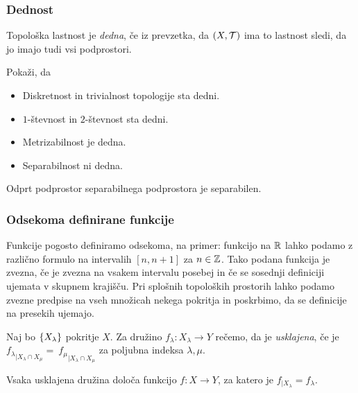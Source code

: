 \subsubsection{Dednost}
\begin{definicija}
    Topološka lastnost je \emph{dedna}, če iz prevzetka, da $(X, \mathcal{T})$ ima to lastnost sledi, da jo imajo tudi vsi podprostori.
\end{definicija}

\begin{primer}
    Pokaži, da
    \begin{itemize}
        \item Diskretnost in trivialnost topologije sta dedni.
        \item $1$-števnost in $2$-števnost sta dedni.
        \item Metrizabilnost je dedna.
        \item Separabilnost ni dedna.
    \end{itemize}
\end{primer}

\begin{opomba}
    Odprt podprostor separabilnega podprostora je separabilen.
\end{opomba}

\subsubsection{Odsekoma definirane funkcije}
Funkcije pogosto definiramo odsekoma, na primer: funkcijo na $\mathbb{R}$ lahko  podamo z različno formulo na intervalih $[n, n+1]$ za $n \in \mathbb{Z}$. Tako podana funkcija je zvezna, če je zvezna na vsakem intervalu posebej in če se sosednji definiciji ujemata v skupnem krajišču. Pri splošnih topoloških prostorih lahko podamo zvezne predpise na vseh množicah nekega pokritja in poskrbimo, da se definicije na presekih ujemajo.

\begin{definicija}
    Naj bo $\left\{X_\lambda\right\}$ pokritje $X$. Za družino $f_\lambda: X_\lambda \to Y$ rečemo, da je \emph{usklajena}, če je ${f_\lambda}_{|X_\lambda \cap X_\mu} =~{f_\mu}_{|X_\lambda \cap X_\mu}$ za poljubna indeksa $\lambda, \mu$.
\end{definicija}

\begin{trditev}
    Vsaka usklajena družina določa funkcijo $f: X \to Y$, za katero je $f_{|X_\lambda} = f_\lambda$.
\end{trditev}

